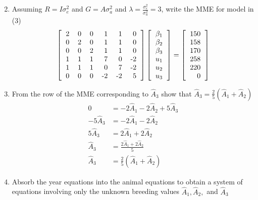 \documentclass[12pt,a4paper]{paper}
\begin{document}
\begin{enumerate}
\begin{equation*}
\end{equation*}
\item Assuming $R=I\sigma^{2}_{e}$ and $G = A\sigma^{2}_{a}$ and $\lambda = \frac{\sigma^{2}_{e}}{\sigma^{2}_{a}} = 3$, write the MME for model in (3)
\begin{equation*}
\left[
\begin{tabular}{rrrrrr}
2 & 0 & 0 & 1 & 1 & 0 \\ 
  0 & 2 & 0 & 1 & 1 & 0 \\ 
  0 & 0 & 2 & 1 & 1 & 0 \\ 
  1 & 1 & 1 & 7 & 0 & -2 \\ 
  1 & 1 & 1 & 0 & 7 & -2 \\ 
  0 & 0 & 0 & -2 & -2 & 5 \\ 
\end{tabular}
\right] \left[\begin{tabular}{r}$\beta_1$\\$\beta_2$\\$\beta_3$\\$u_1$\\$u_2$\\$u_3$\end{tabular}\right] = \left[
\begin{tabular}{r}
150 \\ 
  158 \\ 
  170 \\ 
  258 \\ 
  220 \\ 
  0 \\ 
\end{tabular}
\right]
\end{equation*}
\item From the row of the MME corresponding to $\hat{A}_{3}$ show that $\hat{A}_{3} = \frac{2}{5}(\hat{A}_{1} + \hat{A}_{2})$
\begin{equation*}
\begin{split}
0 &= -2\hat{A}_1 -2\hat{A}_2 + 5\hat{A}_3 \\
-5\hat{A}_3 &= -2\hat{A}_1 - 2\hat{A}_2 \\
5\hat{A}_3 &= 2\hat{A}_1 + 2\hat{A}_2 \\
\hat{A}_3 &= \frac{2\hat{A}_1 + 2\hat{A}_2 }{5}\\
\hat{A}_3 &= \frac{2}{5}(\hat{A}_1 + \hat{A}_2)
\end{split}
\end{equation*}
\item Absorb the year equations into the animal equations to obtain a system of equations involving only the unknown breeding values $\hat{A}_{1}, \hat{A}_{2},$ and $\hat{A}_{3}$

\end{enumerate}
\end{document}
